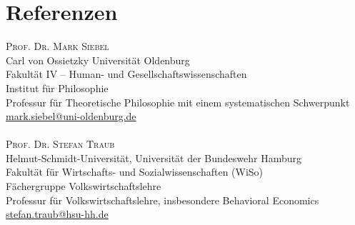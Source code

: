 \documentclass[a4paper,10pt]{article}
\begin{document}
\section{Referenzen}
\textsc{Prof. Dr. Mark Siebel}\\
Carl von Ossietzky Universität Oldenburg\\
Fakultät IV -- Human- und Gesellschaftswissenschaften\\
Institut für Philosophie\\
Professur für Theoretische Philosophie mit einem systematischen Schwerpunkt\\
\href{mailto:mark.siebel@uni-oldenburg.de}{mark.siebel@uni-oldenburg.de}\\
\\
\textsc{Prof. Dr. Stefan Traub}\\
Helmut-Schmidt-Universität, Universität der Bundeswehr Hamburg\\
Fakultät für Wirtschafts- und Sozialwissenschaften (WiSo)\\
Fächergruppe Volkswirtschaftslehre\\
Professur für Volkswirtschaftslehre, insbesondere Behavioral Economics\\
\href{mailto:stefan.traub@hsu-hh.de}{stefan.traub@hsu-hh.de}\\
\end{document}

